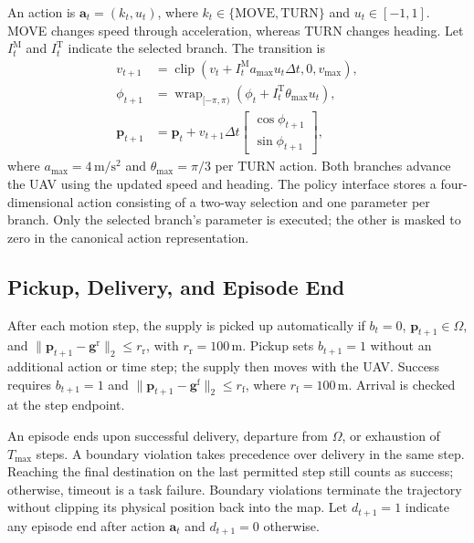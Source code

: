 \documentclass{article}
\begin{document}
An action is $\mathbf a_t=(k_t,u_t)$, where $k_t\in\{\mathrm{MOVE},\mathrm{TURN}\}$ and $u_t\in[-1,1]$. MOVE changes speed through acceleration, whereas TURN changes heading. Let $I_t^{\mathrm M}$ and $I_t^{\mathrm T}$ indicate the selected branch. The transition is
\begin{align}
v_{t+1}&=\operatorname{clip}\!\left(
v_t+I_t^{\mathrm M}a_{\max}u_t\Delta t,0,v_{\max}\right),\\
\phi_{t+1}&=\operatorname{wrap}_{[-\pi,\pi)}\!\left(
\phi_t+I_t^{\mathrm T}\theta_{\max}u_t\right),\\
\mathbf p_{t+1}&=\mathbf p_t+v_{t+1}\Delta t
\begin{bmatrix}\cos\phi_{t+1}\\\sin\phi_{t+1}\end{bmatrix},
\label{eq:uav_dynamics}
\end{align}
where $a_{\max}=4\,\mathrm{m/s^2}$ and $\theta_{\max}=\pi/3$ per TURN action. Both branches advance the UAV using the updated speed and heading. The policy interface stores a four-dimensional action consisting of a two-way selection and one parameter per branch. Only the selected branch's parameter is executed; the other is masked to zero in the canonical action representation.

\subsection{Pickup, Delivery, and Episode End}

After each motion step, the supply is picked up automatically if $b_t=0$, $\mathbf p_{t+1}\in\Omega$, and $\|\mathbf p_{t+1}-\mathbf g^{\mathrm r}\|_2\le r_{\mathrm r}$, with $r_{\mathrm r}=100\,\mathrm{m}$. Pickup sets $b_{t+1}=1$ without an additional action or time step; the supply then moves with the UAV. Success requires $b_{t+1}=1$ and $\|\mathbf p_{t+1}-\mathbf g^{\mathrm f}\|_2\le r_{\mathrm f}$, where $r_{\mathrm f}=100\,\mathrm{m}$. Arrival is checked at the step endpoint.

An episode ends upon successful delivery, departure from $\Omega$, or exhaustion of $T_{\max}$ steps. A boundary violation takes precedence over delivery in the same step. Reaching the final destination on the last permitted step still counts as success; otherwise, timeout is a task failure. Boundary violations terminate the trajectory without clipping its physical position back into the map. Let $d_{t+1}=1$ indicate any episode end after action $\mathbf a_t$ and $d_{t+1}=0$ otherwise.
\end{document}

